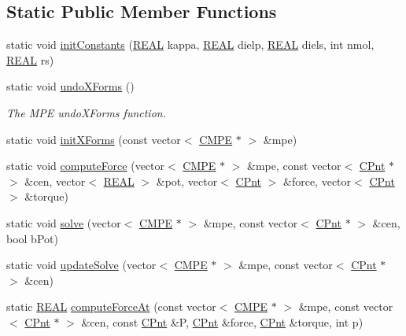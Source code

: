 \subsection*{Static Public Member Functions}
\begin{DoxyCompactItemize}
\item 
static void \hyperlink{classCMPE_accac27799cb676fb3160683583a8619e}{init\-Constants} (\hyperlink{util_8h_a5821460e95a0800cf9f24c38915cbbde}{R\-E\-A\-L} kappa, \hyperlink{util_8h_a5821460e95a0800cf9f24c38915cbbde}{R\-E\-A\-L} dielp, \hyperlink{util_8h_a5821460e95a0800cf9f24c38915cbbde}{R\-E\-A\-L} diels, int nmol, \hyperlink{util_8h_a5821460e95a0800cf9f24c38915cbbde}{R\-E\-A\-L} rs)
\item 
static void \hyperlink{classCMPE_a61688da6057b840ca71dacb47db0c0ac}{undo\-X\-Forms} ()
\begin{DoxyCompactList}\small\item\em The M\-P\-E undo\-X\-Forms function. \end{DoxyCompactList}\item 
static void \hyperlink{classCMPE_a56b7e4c76e20d5e34393a72cc31f6bb3}{init\-X\-Forms} (const vector$<$ \hyperlink{classCMPE}{C\-M\-P\-E} $\ast$ $>$ \&mpe)
\item 
static void \hyperlink{classCMPE_ab825df6d8ab377af3715b86e3a495e34}{compute\-Force} (vector$<$ \hyperlink{classCMPE}{C\-M\-P\-E} $\ast$ $>$ \&mpe, const vector$<$ \hyperlink{classCPnt}{C\-Pnt} $\ast$ $>$ \&cen, vector$<$ \hyperlink{util_8h_a5821460e95a0800cf9f24c38915cbbde}{R\-E\-A\-L} $>$ \&pot, vector$<$ \hyperlink{classCPnt}{C\-Pnt} $>$ \&force, vector$<$ \hyperlink{classCPnt}{C\-Pnt} $>$ \&torque)
\item 
static void \hyperlink{classCMPE_a46bad2726842ca10071fd004010a6e1b}{solve} (vector$<$ \hyperlink{classCMPE}{C\-M\-P\-E} $\ast$ $>$ \&mpe, const vector$<$ \hyperlink{classCPnt}{C\-Pnt} $\ast$ $>$ \&cen, bool b\-Pot)
\item 
static void \hyperlink{classCMPE_a70e20d2a606e1bae88c117b15a511e17}{update\-Solve} (vector$<$ \hyperlink{classCMPE}{C\-M\-P\-E} $\ast$ $>$ \&mpe, const vector$<$ \hyperlink{classCPnt}{C\-Pnt} $\ast$ $>$ \&cen)
\item 
static \hyperlink{util_8h_a5821460e95a0800cf9f24c38915cbbde}{R\-E\-A\-L} \hyperlink{classCMPE_a7724d01cc2dc82b19e90e723ed2ba050}{compute\-Force\-At} (const vector$<$ \hyperlink{classCMPE}{C\-M\-P\-E} $\ast$ $>$ \&mpe, const vector$<$ \hyperlink{classCPnt}{C\-Pnt} $\ast$ $>$ \&cen, const \hyperlink{classCPnt}{C\-Pnt} \&P, \hyperlink{classCPnt}{C\-Pnt} \&force, \hyperlink{classCPnt}{C\-Pnt} \&torque, int p)

\end{DoxyCompactItemize}
